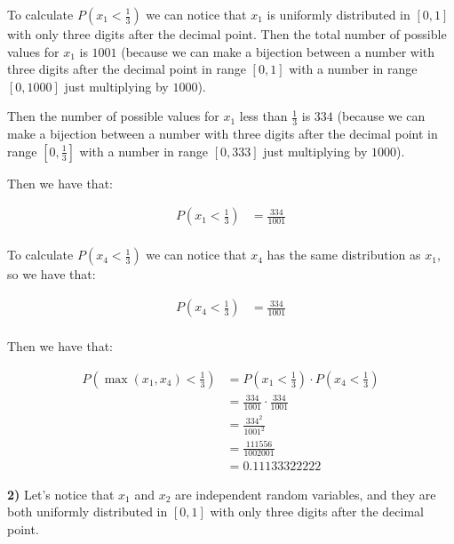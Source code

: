 To calculate $P(x_1 < \frac{1}{3})$ we can notice that $x_1$ is
uniformly distributed in $[0,1]$ with only three digits after the
decimal point. Then the total number of possible values for $x_1$ is
$1001$ (because we can make a bijection between a number with three
digits after the decimal point in range $[0,1]$ with a number in
range $[0,1000]$ just multiplying by $1000$).

Then the number of possible values for $x_1$ less than $\frac{1}{3}$
is $334$ (because we can make a bijection between a number with three
digits after the decimal point in range $[0,\frac{1}{3}]$ with a
number in range $[0,333]$ just multiplying by $1000$).

Then we have that:

\begin{equation*}
    \begin{split}
        P(x_1 < \frac{1}{3}) & = \frac{334}{1001} \\
    \end{split}
\end{equation*}

To calculate $P(x_4 < \frac{1}{3})$ we can notice that $x_4$ has
the same distribution as $x_1$, so we have that:

\begin{equation*}
    \begin{split}
        P(x_4 < \frac{1}{3}) & = \frac{334}{1001} \\
    \end{split}
\end{equation*}

Then we have that:

\begin{equation*}
    \begin{split}
        P(\max(x_1, x_4) < \frac{1}{3}) & = P(x_1 < \frac{1}{3}) \cdot P(x_4 < \frac{1}{3}) \\
                                        & = \frac{334}{1001} \cdot \frac{334}{1001}         \\
                                        & = \frac{334^2}{1001^2}                            \\
                                        & = \frac{111556}{1002001}                          \\
                                        & = 0.11133322222
    \end{split}
\end{equation*}

\textbf{2)} Let's notice that $x_1$ and $x_2$ are independent
random variables, and they are both uniformly distributed in $[0,1]$
with only three digits after the decimal point.

